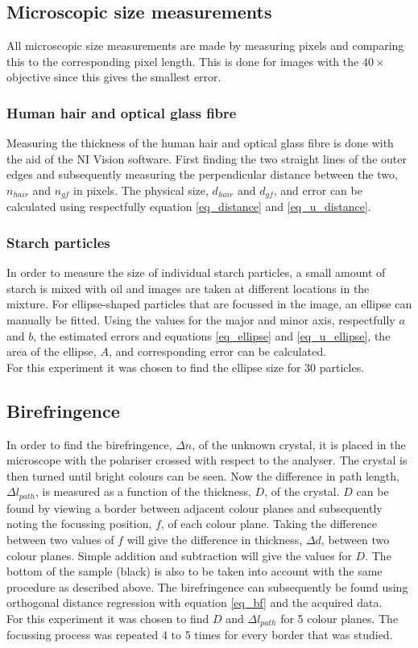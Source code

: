 \subsection{Microscopic size measurements}
All microscopic size measurements are made by measuring pixels and comparing this to the corresponding pixel length. This is done for images with the $40\times$ objective since this gives the smallest error.

\subsubsection*{Human hair and optical glass fibre}
Measuring the thickness of the human hair and optical glass fibre is done with the aid of the NI Vision software. First finding the two straight lines of the outer edges and subsequently measuring the perpendicular distance between the two, $n_{hair}$ and $n_{gf}$ in pixels. The physical size, $d_{hair}$ and $d_{gf}$, and error can be calculated using respectfully equation \ref{eq_distance} and \ref{eq_u_distance}. 


\subsubsection*{Starch particles}

In order to measure the size of individual starch particles, a small amount of starch is mixed with oil and images are taken at different locations in the mixture. For ellipse-shaped particles that are focussed in the image, an ellipse can manually be fitted. Using the values for the major and minor axis, respectfully $a$ and $b$, the estimated errors and equations \ref{eq_ellipse} and \ref{eq_u_ellipse}, the area of the ellipse, $A$, and corresponding error can be calculated.\\
For this experiment it was chosen to find the ellipse size for 30 particles.


\subsection{Birefringence}

In order to find the birefringence, $\Delta n$, of the unknown crystal, it is placed in the microscope with the polariser crossed with respect to the analyser. The crystal is then turned until bright colours can be seen. Now the difference in path length, $\Delta l_{path}$, is measured as a function of the thickness, $D$, of the crystal. $D$ can be found by viewing a border between adjacent colour planes and subsequently noting the focussing position, $f$, of each colour plane. Taking the difference between two values of $f$ will give the difference in thickness, $\Delta d$, between two colour planes. Simple addition and subtraction will give the values for $D$. The bottom of the sample (black) is also to be taken into account with the same procedure as described above. The birefringence can subsequently be found using orthogonal distance regression with equation \ref{eq_bf} and the acquired data.\\
For this experiment it was chosen to find $D$ and $\Delta l_{path}$ for 5 colour planes. The focussing process was repeated 4 to 5 times for every border that was studied.

